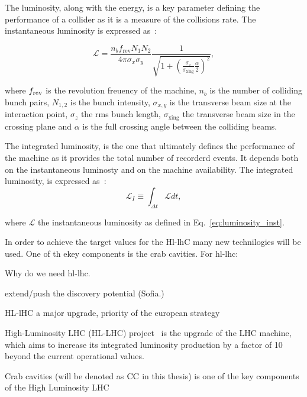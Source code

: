 The luminosity, along with the energy, is a key parameter defining the performance of a collider as it is a measure of the collisions rate. The instantaneous luminosity is expressed as~\cite{luminosity}:

\begin{equation}\label{eq:luminosity_inst}
    \mathcal{L} = \frac{n_b f_\mathrm{rev}N_1 N_2}{4 \pi \sigma_x \sigma_y} \frac{1}{\sqrt{1+(\frac{\sigma_z}{\sigma_\mathrm{xing}} \frac{\alpha}{2})^2}},
\end{equation}

where ${f_\mathrm{rev}}$ is the revolution freuency of the machine, $n_b$ is the number of colliding bunch pairs, $N_{1,2}$ is the bunch intensity, $\sigma_{x,y}$ is the transverse beam size at the interaction point, $\sigma_z$ the rms bunch length, $\sigma_{\mathrm{xing}}$ the transverse beam size in the crossing plane and $\alpha$ is the full crossing angle between the colliding beams.

The integrated luminosity, is the one that ultimately defines the performance of the machine as it provides the total number of recorderd events. It depends both on the instantaneous luminosty and on the machine availability. The integrated luminosity, is expressed as~\cite{HL_LHC_yellow_report}:
\begin{equation}\label{eq:integrated_luminosity}
    \mathcal{L}_I \equiv \int_{\Delta t} \mathcal{L} dt,
\end{equation}

where $\mathcal{L}$ the instantaneous luminosity as defined in Eq.~\eqref{eq:luminosity_inst}.

In order to achieve the target values for the Hl-lhC many new technilogies will be used. One of th ekey components is the crab cavities.
For hl-lhc:

Why do we need hl-lhc.

extend/push the discovery potential (Sofia.)

HL-lHC a major upgrade, priority of the european strategy





High-Luminosity LHC (HL-LHC) project~\cite{HL-LHC} is the upgrade of the LHC machine, which aims to increase its integrated luminosity production by a factor of 10 beyond the current operational values.


Crab cavities (will be denoted as ${\mathrm{CC}}$ in this thesis) is one of the key components of the High Luminosity LHC





